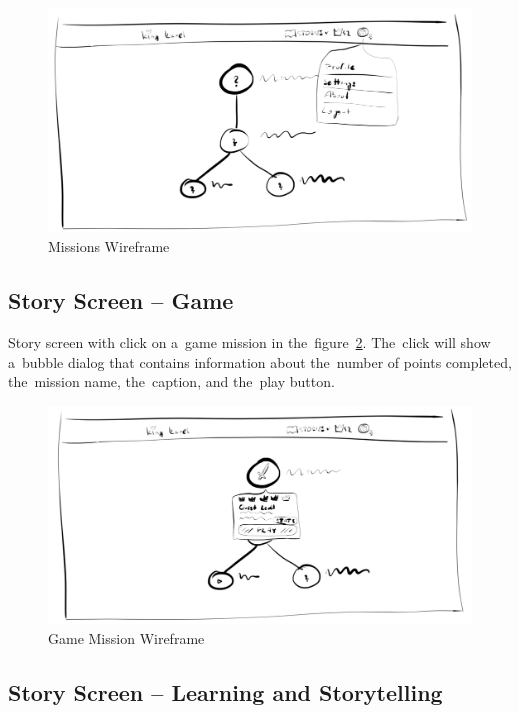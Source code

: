 \begin{figure}
    \centering
    \includegraphics[width=1\linewidth]{assets/design/ui/wir_stories.png}
    \caption{Missions Wireframe}
    \label{fig:design:wir:missions}
\end{figure}

\subsection{Story Screen -- Game}

Story screen with click on a~game mission in the~figure~\ref{fig:design:wir:story-game}.
The~click will show a~bubble dialog that contains information about the~number of points completed, the~mission name, the~caption, and the~play button.

\begin{figure}
    \centering
    \includegraphics[width=1\linewidth]{assets/design/ui/wir_game.png}
    \caption{Game Mission Wireframe}
    \label{fig:design:wir:story-game}
\end{figure}

\subsection{Story Screen -- Learning and Storytelling}

